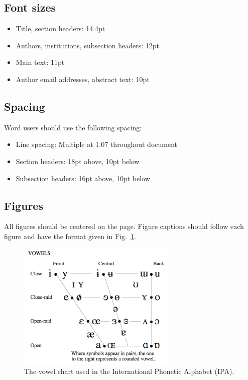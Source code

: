 \documentclass{tls}
\begin{document}
\subsection{Font sizes}

\begin{itemize}
  \item Title, section headers: 14.4pt
  \item Authors, institutions, subsection headers: 12pt
  \item Main text: 11pt
  \item Author email addresses, abstract text: 10pt
\end{itemize}


\subsection{Spacing}

Word users should use the following spacing:

\begin{itemize}
  \item Line spacing: Multiple at 1.07 throughout document
  \item Section headers: 18pt above, 10pt below
  \item Subsection headers: 16pt above, 10pt below
\end{itemize}


\subsection{Figures}

All figures should be centered on the page. Figure captions should follow each
figure and have the format given in Fig.~\ref{fig:vowels}.

\begin{figure}[ht]
  \begin{center}
    \includegraphics[width=3in]{Example-IPA.png}
  \end{center}
  \caption{The vowel chart used in the International Phonetic Alphabet (IPA).}
  \label{fig:vowels}
\end{figure}
\end{document}
